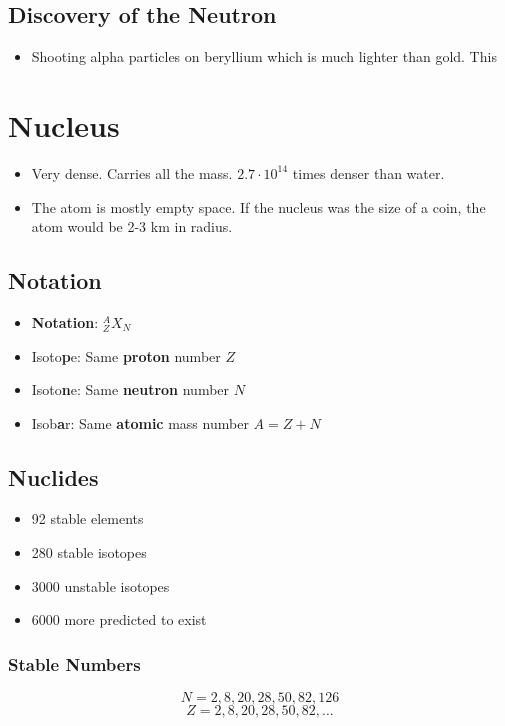 \documentclass{article}
\begin{document}
\subsection{Discovery of the Neutron}
\begin{itemize}
    \item Shooting alpha particles on beryllium which is much lighter than gold. This 
\end{itemize}

\section{Nucleus}
\begin{itemize}
    \item Very dense. Carries all the mass. $2.7 ⋅ 10^{14}$ times denser than water.
    \item The atom is mostly empty space. If the nucleus was the size of a coin, the atom would be 2-3 km in radius. 
\end{itemize}
\subsection{Notation}
\begin{itemize}
    \item \textbf{Notation}: $_{Z}^{A}X_{N}$ 
    \item Isoto\textbf{p}e: Same \textbf{proton} number $Z$
    \item Isoto\textbf{n}e: Same \textbf{neutron} number $N$
    \item Isob\textbf{a}r: Same \textbf{atomic} mass number $A = Z + N$
\end{itemize}

\subsection{Nuclides}
\begin{itemize}
    \item 92 stable elements
    \item 280 stable isotopes
    \item 3000 unstable isotopes
    \item 6000 more predicted to exist
\end{itemize}
\subsubsection{Stable Numbers}
\begin{equation}
N = 2, 8, 20, 28, 50, 82, 126
\end{equation}
\begin{equation}
Z = 2, 8, 20, 28, 50, 82, \ldots     
\end{equation}
\end{document}
